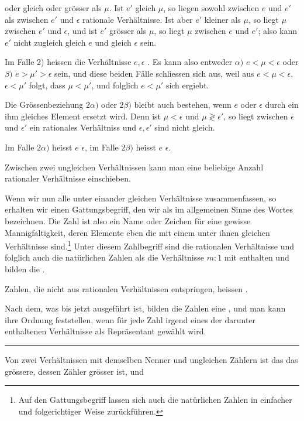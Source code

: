 oder gleich oder grösser als $\mu$. Ist $e'$ gleich $\mu$, so liegen
sowohl zwischen $e$ und $e'$ als zwischen $e'$ und $\epsilon$ rationale
Verhältnisse. Ist aber $e'$ kleiner als $\mu$, so liegt $\mu$ zwischen
$e'$ und $\epsilon$, und ist $e'$ grösser als $\mu$, so liegt $\mu$
zwischen $e$ und $e'$; also kann $e'$ nicht zugleich gleich $e$ und
gleich $\epsilon$ sein.

Im Falle 2) heissen die Verhältnisse $e,\epsilon$ .
Es kann also entweder $\alpha)$ $e<\mu<\epsilon$ oder $\beta)$
$e>\mu'>\epsilon$ sein, und diese beiden Fälle schliessen sich aus,
weil aus $e<\mu<\epsilon$, $\epsilon<\mu'$ folgt, dass $\mu<\mu'$,
und folglich $e<\mu'$ sich ergiebt.

Die Grössenbeziehung $2\alpha)$ oder $2\beta)$ bleibt auch bestehen,
wenn $e$ oder $\epsilon$ durch ein ihm gleiches Element ersetzt wird.
Denn ist $\mu<\epsilon$ und $\mu\gtrless\epsilon'$, so liegt zwischen
$\epsilon$ und $\epsilon'$ ein rationales Verhältniss und
$\epsilon,\epsilon'$ sind nicht gleich.

Im Falle $2\alpha)$ heisst $e$  $\epsilon$, im
Falle $2\beta)$ heisst $e$  $\epsilon$.

Zwischen zwei ungleichen Verhältnissen kann man eine beliebige Anzahl
rationaler Verhältnisse einschieben.

Wenn wir nun alle unter einander gleichen Verhältnisse zusammenfassen,
so erhalten wir einen Gattungsbegriff, den wir als  im
allgemeinen Sinne des Wortes bezeichnen. Die Zahl ist also ein Name
oder Zeichen für eine gewisse Mannigfaltigkeit, deren Elemente eben
die mit einem unter ihnen gleichen Verhältnisse sind.\setcounter{footnote}{0}\footnote{Auf den
Gattungsbegriff lassen sich auch die natürlichen Zahlen in einfacher
und folgerichtiger Weise zurückführen.} Unter diesem Zahlbegriff sind
die rationalen Verhältnisse und folglich auch die natürlichen Zahlen
als die Verhältnisse $m:1$ mit enthalten und bilden die
.

Zahlen, die nicht aus rationalen Verhältnissen entspringen, heissen
.

Nach dem, was bis jetzt ausgeführt ist, bilden die Zahlen eine
, und man kann ihre Ordnung feststellen,
wenn für jede Zahl irgend eines der darunter enthaltenen Verhältnisse
als Repräsentant gewählt wird.

\begin{center}
\rule{0.18\linewidth}{0.4pt}
\end{center}

Von zwei Verhältnissen mit demselben Nenner und ungleichen Zählern ist
das das grössere, dessen Zähler grösser ist, und
